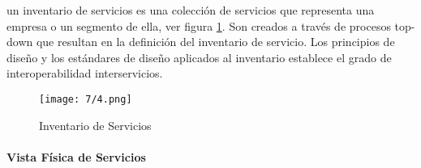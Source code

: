  
 un \gls{inventario de servicios} es una colección de servicios que representa una empresa o un segmento de ella, ver figura \ref{fig:inventario}. Son creados a través de procesos top-down que resultan en la definición del inventario de servicio. Los principios de diseño y los estándares de diseño aplicados al inventario  establece el grado de interoperabilidad interservicios. 
  
  
  \begin{figure}%
  	\texttt{[image: 7/4.png]}
  	\caption{Inventario de Servicios}
  	\label{fig:inventario}
  \end{figure}
  
  
  
 \paragraph{Vista F\'isica  de Servicios}
  
